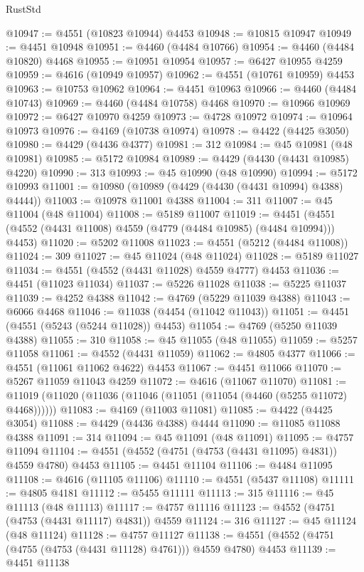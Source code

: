 \begin{lexlean}{RustStd}
\begin{coremodule}
@10947 := @4551 (@10823 @10944) @4453
@10948 := @10815 @10947
@10949 := @4451 @10948
@10951 := @4460 (@4484 @10766)
@10954 := @4460 (@4484 @10820) @4468
@10955 := @10951 @10954
@10957 := @6427 @10955 @4259
@10959 := @4616 (@10949 @10957)
@10962 := @4551 (@10761 @10959) @4453
@10963 := @10753 @10962
@10964 := @4451 @10963
@10966 := @4460 (@4484 @10743)
@10969 := @4460 (@4484 @10758) @4468
@10970 := @10966 @10969
@10972 := @6427 @10970 @4259
@10973 := @4728 @10972
@10974 := @10964 @10973
@10976 := @4169 (@10738 @10974)
@10978 := @4422 (@4425 @3050)
@10980 := @4429 (@4436 @4377)
@10981 := 312
@10984 := @45 @10981 (@48 @10981)
@10985 := @5172 @10984
@10989 := @4429 (@4430 (@4431 @10985) @4220)
@10990 := 313
@10993 := @45 @10990 (@48 @10990)
@10994 := @5172 @10993
@11001 := @10980 (@10989 (@4429 (@4430 (@4431 @10994) @4388) @4444))
@11003 := @10978 @11001 @4388
@11004 := 311
@11007 := @45 @11004 (@48 @11004)
@11008 := @5189 @11007
@11019 := @4451 (@4551 (@4552 (@4431 @11008) @4559 (@4779 (@4484 @10985) (@4484 @10994))) @4453)
@11020 := @5202 @11008
@11023 := @4551 (@5212 (@4484 @11008))
@11024 := 309
@11027 := @45 @11024 (@48 @11024)
@11028 := @5189 @11027
@11034 := @4551 (@4552 (@4431 @11028) @4559 @4777) @4453
@11036 := @4451 (@11023 @11034)
@11037 := @5226 @11028
@11038 := @5225 @11037
@11039 := @4252 @4388
@11042 := @4769 (@5229 @11039 @4388)
@11043 := @6066 @4468
@11046 := @11038 (@4454 (@11042 @11043))
@11051 := @4451 (@4551 (@5243 (@5244 @11028)) @4453)
@11054 := @4769 (@5250 @11039 @4388)
@11055 := 310
@11058 := @45 @11055 (@48 @11055)
@11059 := @5257 @11058
@11061 := @4552 (@4431 @11059)
@11062 := @4805 @4377
@11066 := @4551 (@11061 @11062 @4622) @4453
@11067 := @4451 @11066
@11070 := @5267 @11059 @11043 @4259
@11072 := @4616 (@11067 @11070)
@11081 := @11019 (@11020 (@11036 (@11046 (@11051 (@11054 (@4460 (@5255 @11072) @4468))))))
@11083 := @4169 (@11003 @11081)
@11085 := @4422 (@4425 @3054)
@11088 := @4429 (@4436 @4388) @4444
@11090 := @11085 @11088 @4388
@11091 := 314
@11094 := @45 @11091 (@48 @11091)
@11095 := @4757 @11094
@11104 := @4551 (@4552 (@4751 (@4753 (@4431 @11095) @4831)) @4559 @4780) @4453
@11105 := @4451 @11104
@11106 := @4484 @11095
@11108 := @4616 (@11105 @11106)
@11110 := @4551 (@5437 @11108)
@11111 := @4805 @4181
@11112 := @5455 @11111
@11113 := 315
@11116 := @45 @11113 (@48 @11113)
@11117 := @4757 @11116
@11123 := @4552 (@4751 (@4753 (@4431 @11117) @4831)) @4559
@11124 := 316
@11127 := @45 @11124 (@48 @11124)
@11128 := @4757 @11127
@11138 := @4551 (@4552 (@4751 (@4755 (@4753 (@4431 @11128) @4761))) @4559 @4780) @4453
@11139 := @4451 @11138

\end{coremodule}
\end{lexlean}
